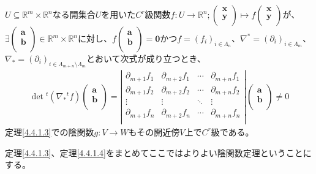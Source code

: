 \documentclass[dvipdfmx]{jsarticle}
\begin{document}
\begin{thm}[よりよい陰関数定理]\label{4.4.1.4}
$U \subseteq \mathbb{R}^{m} \times \mathbb{R}^{n}$なる開集合$U$を用いた$C^{r}$級関数$f:U \rightarrow \mathbb{R}^{n};\begin{pmatrix}
\mathbf{x} \\
\mathbf{y} \\
\end{pmatrix} \mapsto f\begin{pmatrix}
\mathbf{x} \\
\mathbf{y} \\
\end{pmatrix}$が、$\exists\begin{pmatrix}
\mathbf{a} \\
\mathbf{b} \\
\end{pmatrix} \in \mathbb{R}^{m} \times \mathbb{R}^{n}$に対し、$f\begin{pmatrix}
\mathbf{a} \\
\mathbf{b} \\
\end{pmatrix} = \mathbf{0}$かつ$f = \left( f_{i} \right)_{i \in \varLambda_{n}}$、$\nabla^{*} = \left( \partial_{i} \right)_{i \in \varLambda_{m}}$、$\nabla_{*} = \left( \partial_{i} \right)_{i \in \varLambda_{m + n} \setminus \varLambda_{m}}$とおいて次式が成り立つとき、
\begin{align*}
\det{{}^{t}\left( \nabla_{*}{}^{t}f \right)}\begin{pmatrix}
\mathbf{a} \\
\mathbf{b} \\
\end{pmatrix} = \left| \begin{matrix}
\partial_{m + 1}f_{1} & \partial_{m + 2}f_{1} & \cdots & \partial_{m + n}f_{1} \\
\partial_{m + 1}f_{2} & \partial_{m + 2}f_{2} & \cdots & \partial_{m + n}f_{2} \\
 \vdots & \vdots & \ddots & \vdots \\
\partial_{m + 1}f_{n} & \partial_{m + 2}f_{n} & \cdots & \partial_{m + n}f_{n} \\
\end{matrix} \right|\begin{pmatrix}
\mathbf{a} \\
\mathbf{b} \\
\end{pmatrix} \neq 0
\end{align*}
定理\ref{4.4.1.3}での陰関数$g:V \rightarrow W$もその開近傍$V$上で$C^{r}$級である。\par
定理\ref{4.4.1.3}、定理\ref{4.4.1.4}をまとめてここではよりよい陰関数定理ということにする。
\end{thm}
\end{document}
